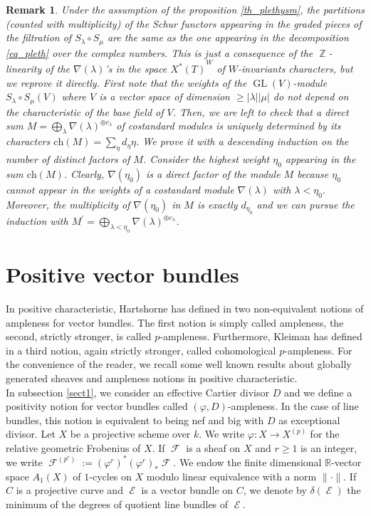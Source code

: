 \documentclass[11pt]{amsart}
\numberwithin{subsection}{section}
\numberwithin{figure}{section}
\numberwithin{table}{section}
\theoremstyle{1}
\theoremstyle{2}
\newtheorem{rmrk}[theorem]{Remark}
\DeclareMathOperator{\Z}{\mathbb{Z}}
\DeclareMathOperator{\GL}{GL}
\DeclareMathOperator{\Fc}{\mathcal{F}}
\DeclareMathOperator{\E}{\mathcal{E}}
\begin{document}
\begin{rmrk}
Under the assumption of the proposition \ref{th_plethysm}, the partitions (counted with multiplicity) of the Schur functors appearing in the graded pieces of the filtration of $S_{\lambda} \circ S_{\mu}$ are the same as the one appearing in the decomposition \eqref{eq_pleth} over the complex numbers. This is just a consequence of the $\Z$-linearity of the $\nabla(\lambda)$'s in the space ${X^*(T)}^{W}$ of $W$-invariants characters, but we reprove it directly. First note that the weights of the $\GL(V)$-module $S_{\lambda}\circ S_{\mu}(V)$ where $V$ is a vector space of dimension $\geq |\lambda | |\mu |$ do not depend on the characteristic of the base field of $V$. Then, we are left to check that a direct sum $M = \bigoplus_{\lambda} \nabla(\lambda)^{\oplus c_{\lambda}}$ of costandard modules is uniquely determined by its characters $\text{ch}(M) = \sum_{\eta} d_{\eta} \eta$. We prove it with a descending induction on the number of distinct factors of $M$. Consider the highest weight $\eta_0$ appearing in the sum $\text{ch}(M)$. Clearly, $\nabla(\eta_0)$ is a direct factor of the module $M$ because $\eta_0$ cannot appear in the weights of a costandard module $\nabla(\lambda)$ with $\lambda < \eta_0$. Moreover, the multiplicity of $\nabla(\eta_0)$ in $M$ is exactly $d_{\eta_0}$ and we can pursue the induction with $M^\prime =  \bigoplus_{\lambda < \eta_0} \nabla(\lambda)^{\oplus c_{\lambda}}$. 
\end{rmrk}
\section{Positive vector bundles}\label{sect_pos}
In positive characteristic, Hartshorne has defined in \cite{MR193092} two non-equivalent notions of ampleness for vector bundles. The first notion is simply called ampleness, the second, strictly stronger, is called $p$-ampleness. Furthermore, Kleiman has defined in \cite{MR251044} a third notion, again strictly stronger, called cohomological $p$-ampleness. For the convenience of the reader, we recall some well known results about globally generated sheaves and ampleness notions in positive characteristic.\\

In subsection \ref{sect1}, we consider an effective Cartier divisor $D$ and we define a positivity notion for vector bundles called $(\varphi,D)$-ampleness. In the case of line bundles, this notion is equivalent to being nef and big with $D$ as exceptional divisor. Let $X$ be a projective scheme over $k$. We write $\varphi : X \rightarrow X^{(p)}$ for the relative geometric Frobenius of $X$. If $\Fc$ is a sheaf on $X$ and $r \geq 1$ is an integer, we write $\Fc^{(p^r)} := {(\varphi^r)}^*{(\varphi^r)}_*\Fc$. We endow the finite dimensional $\mathbb{R}$-vector space $A_1(X)$ of $1$-cycles on $X$ modulo linear equivalence with a norm $\lVert \cdot \rVert$. If $C$ is a projective curve and $\E$ is a vector bundle on $C$, we denote by $\delta(\E)$ the minimum of the degrees of quotient line bundles of $\E$.
\end{document}
